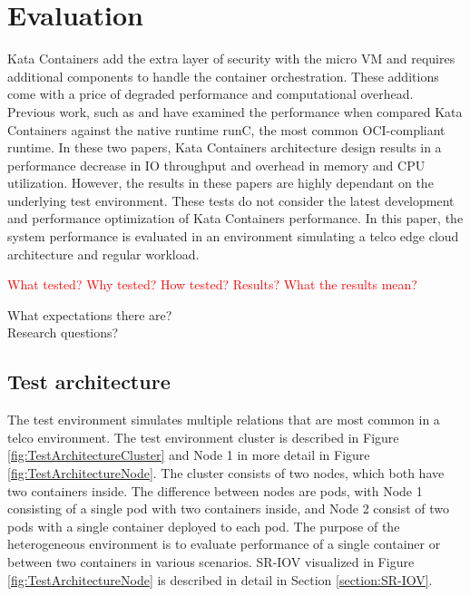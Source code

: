 \chapter{Evaluation}
\label{chapter:evaluation}

Kata Containers add the extra layer of security with the micro VM and requires additional components to handle the container orchestration. These additions come with a price of degraded performance and computational overhead. Previous work, such as \cite{Kumar2020} and \cite{EverartsdeVelp2020} have examined the performance when compared Kata Containers against the native runtime runC, the most common OCI-compliant runtime. In these two papers, Kata Containers architecture design results in a performance decrease in IO throughput and overhead in memory and CPU utilization. However, the results in these papers are highly dependant on the underlying test environment. These tests do not consider the latest development and performance optimization of Kata Containers performance. In this paper, the system performance is evaluated in an environment simulating a telco edge cloud architecture and regular workload.

\textcolor{red}{What tested?}
\textcolor{red}{Why tested?}
\textcolor{red}{How tested?}
\textcolor{red}{Results?}
\textcolor{red}{What the results mean?}

What expectations there are? \\
Research questions?

\section{Test architecture}
\label{section:test_architecture}

The test environment simulates multiple relations that are most common in a telco environment. The test environment cluster is described in Figure \ref{fig:TestArchitectureCluster} and Node 1 in more detail in Figure \ref{fig:TestArchitectureNode}. The cluster consists of two nodes, which both have two containers inside. The difference between nodes are pods, with Node 1 consisting of a single pod with two containers inside, and Node 2 consist of two pods with a single container deployed to each pod. The purpose of the heterogeneous environment is to evaluate performance of a single container or between two containers in various scenarios. SR-IOV visualized in Figure \ref{fig:TestArchitectureNode} is described in detail in Section \ref{section:SR-IOV}.

